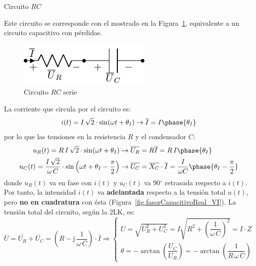 \documentclass[11pt]{book} %
\makeatletter
\numberwithin{dummy}{section}
\theoremstyle{ocrenumbox}
\theoremstyle{blacknumex}
\theoremstyle{blacknumbox}
\theoremstyle{ocrenum}
\renewcommand{\subsection}{\@startsection {subsection}{2}{\z@}
{-3ex \@plus -0.1ex \@minus -.4ex}
{0.5ex \@plus.2ex }
{\normalfont\sffamily\bfseries}}
\newlength\esp
\makeatother
\begin{document}
	\subsection{Circuito $RC$}\label{sec.RC}
	
	Este circuito se corresponde con el mostrado en la Figura~\ref{fig.RC}, equivalente a un circuito capacitivo con pérdidas. 
	\begin{figure}[h]
		\centering
		\includegraphics{../figs/RC.pdf}
		\caption{Circuito $RC$ serie}
		\label{fig.RC}
	\end{figure}
	
	La corriente que circula por el circuito es:
	\begin{equation*}
		i(t)=I\,\sqrt{2}\cdot\sin(\omega t+\theta_I)\rightarrow\overline{I}=I\phase{\theta_I}
	\end{equation*}
	por lo que las tensiones en la resistencia $R$ y el condensador $C$:
	\begin{align*}
		u_R(t)=R\, I\,\sqrt{2}\cdot\sin(\omega t+\theta_I)&\rightarrow \overline{U_R} = R \overline{I}=R\,I\phase{\theta_I}\\ 
		u_C(t)=\dfrac{I\,\sqrt{2}}{\omega\,C} \cdot \sin \left(\omega t+\theta_I-\frac{\pi}{2}\right)&\rightarrow \overline{U_C}=\overline{X_C}\cdot\overline{I}=\dfrac{I}{\omega C}\phase{\theta_I-\frac{\pi}{2}}
	\end{align*}
	donde $u_R(t)$ va en fase con $i(t)$ y $u_C(t)$ va 90$^\circ$ retrasada respecto a $i(t)$. Por tanto, la intensidad $i(t)$ va \textbf{adelantada} respecto a la tensión total $u(t)$, pero \textbf{no en cuadratura} con ésta  (Figura~\ref{fig.fasorCapacitivoReal_VI}). La tensión total del circuito, según la 2LK, es:  
	\begin{equation*}
		\overline{U} = \overline{U_R} + \overline{U_C} =\left(R - \mathrm{j}\,\dfrac{1}{\omega\,C}\right) \cdot \overline{I}\Rightarrow 
		\begin{cases}
			U=\sqrt{U_R^2+U_C^2}=I\sqrt{R^2+\left(\dfrac{1}{\omega\,C}\right)^2}=I\cdot Z\\
			\theta=-\arctan\left( \dfrac{U_C}{U_R}\right)=-\arctan\left( \dfrac{1}{R\,\omega\,C}\right)
		\end{cases}
	\end{equation*}
	
\end{document}
